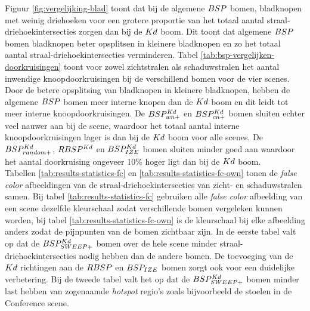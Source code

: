 Figuur \ref{fig:vergelijking-blad} toont dat bij de algemene $BSP$ bomen, bladknopen met weinig driehoeken voor een grotere proportie van het totaal aantal straal-driehoekintersecties zorgen dan bij de $Kd$ boom. Dit toont dat algemene $BSP$ bomen bladknopen beter opsplitsen in kleinere bladknopen en zo het totaal aantal straal-driehoekintersecties verminderen. Tabel \ref{tab:bsp-vergelijken-doorkruisingen} toont voor zowel zichtstralen als schaduwstralen het aantal inwendige knoopdoorkruisingen bij de verschillend bomen voor de vier scenes.
Door de betere opsplitsing van bladknopen in kleinere bladknopen, hebben de algemene $BSP$ bomen meer interne knopen dan de $Kd$ boom en dit leidt tot meer interne knoopdoorkruisingen. 
De $BSP^{Kd}_{wn+}$ en $BSP^{Kd}_{cn+}$ bomen sluiten echter veel nauwer aan bij de scene, waardoor het totaal aantal interne knoopdoorkruisingen lager is dan bij de $Kd$ boom voor alle scenes.
De $BSP^{Kd}_{random+}$, $RBSP^{Kd}$ en $BSP^{Kd}_{IZE}$ bomen sluiten minder goed aan waardoor het aantal doorkruising ongeveer 10\% hoger ligt dan bij de $Kd$ boom.\\

Tabellen \ref{tab:results-statistics-fc} en \ref{tab:results-statistics-fc-own} tonen de \textit{false color} afbeeldingen van de straal-driehoekintersecties van zicht- en schaduwstralen samen.
Bij tabel \ref{tab:results-statistics-fc} gebruiken alle \textit{false color} afbeelding van een scene dezelfde kleurschaal zodat verschillende bomen vergeleken kunnen worden, bij tabel \ref{tab:results-statistics-fc-own} is de kleurschaal bij elke afbeelding anders zodat de pijnpunten van de bomen zichtbaar zijn.
In de eerste tabel valt op dat de $BSP^{Kd}_{SWEEP+}$ bomen over de hele scene minder straal-driehoekintersecties nodig hebben dan de andere bomen. De toevoeging van de $Kd$ richtingen aan de $RBSP$ en $BSP_{IZE}$ bomen zorgt ook voor een duidelijke verbetering. Bij de tweede tabel valt het op dat de $BSP^{Kd}_{SWEEP+}$ bomen minder last hebben van zogenaamde \textit{hotspot} regio's zoals bijvoorbeeld de stoelen in de Conference scene.
\\

